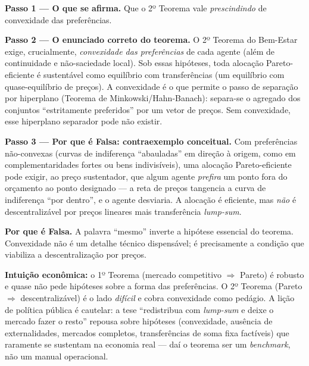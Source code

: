 \begin{solucao}
\textbf{Passo 1 --- O que se afirma.} Que o 2º Teorema vale \emph{prescindindo} de convexidade das preferências.

\textbf{Passo 2 --- O enunciado correto do teorema.} O 2º Teorema do Bem-Estar exige, crucialmente, \emph{convexidade das preferências} de cada agente (além de continuidade e não-saciedade local). Sob essas hipóteses, toda alocação Pareto-eficiente é sustentável como equilíbrio com transferências (um equilíbrio com quase-equilíbrio de preços). A convexidade é o que permite o passo de separação por hiperplano (Teorema de Minkowski/Hahn-Banach): separa-se o agregado dos conjuntos ``estritamente preferidos'' por um vetor de preços. Sem convexidade, esse hiperplano separador pode não existir.

\textbf{Passo 3 --- Por que é Falsa: contraexemplo conceitual.} Com preferências não-convexas (curvas de indiferença ``abauladas'' em direção à origem, como em complementaridades fortes ou bens indivisíveis), uma alocação Pareto-eficiente pode exigir, ao preço sustentador, que algum agente \emph{prefira} um ponto fora do orçamento ao ponto designado --- a reta de preços tangencia a curva de indiferença ``por dentro'', e o agente desviaria. A alocação é eficiente, mas \emph{não} é descentralizável por preços lineares mais transferência \emph{lump-sum}.

\textbf{Por que é Falsa.} A palavra ``mesmo'' inverte a hipótese essencial do teorema. Convexidade não é um detalhe técnico dispensável; é precisamente a condição que viabiliza a descentralização por preços.

\textbf{Intuição econômica:} o 1º Teorema (mercado competitivo $\Rightarrow$ Pareto) é robusto e quase não pede hipóteses sobre a forma das preferências. O 2º Teorema (Pareto $\Rightarrow$ descentralizável) é o lado \emph{difícil} e cobra convexidade como pedágio. A lição de política pública é cautelar: a tese ``redistribua com \emph{lump-sum} e deixe o mercado fazer o resto'' repousa sobre hipóteses (convexidade, ausência de externalidades, mercados completos, transferências de soma fixa factíveis) que raramente se sustentam na economia real --- daí o teorema ser um \emph{benchmark}, não um manual operacional.
\end{solucao}


